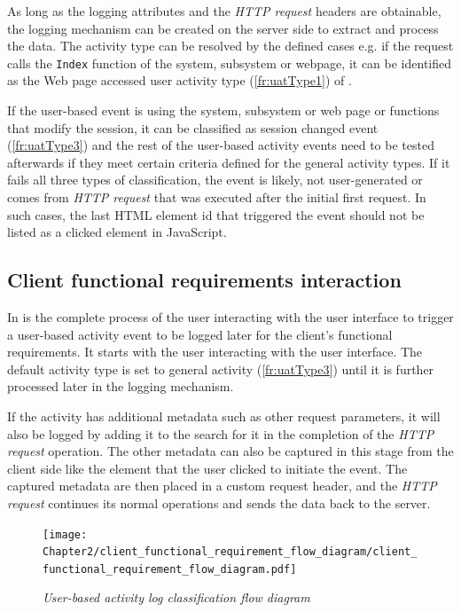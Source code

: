 As long as the logging attributes and the \textit{HTTP request} headers are obtainable, the logging mechanism can be created on the server side to extract and process the data. The activity type can be resolved by the defined cases e.g. if the request calls the \texttt{Index} function of the system, subsystem or webpage, it can be identified as the Web page accessed user activity type (\ref{fr:uatType1}) of .\par If the user-based event is using the system, subsystem or web page or functions that modify the session, it can be classified as session changed event (\ref{fr:uatType3}) and the rest of the user-based activity events need to be tested afterwards if they meet certain criteria defined for the general activity types. If it fails all three types of classification, the event is likely, not user-generated or comes from \textit{HTTP request} that was executed after the initial first request. In such cases, the last HTML element id that triggered the event should not be listed as a clicked element in JavaScript.

\subsection{Client functional requirements interaction}
\par In  is the complete process of the user interacting with the user interface to trigger a user-based activity event to be logged later for the client's functional requirements. It starts with the user interacting with the user interface. The default activity type is set to general activity (\ref{fr:uatType3}) until it is further processed later in the logging mechanism.\par If the activity has additional metadata such as other request parameters, it will also be logged by adding it to the search for it in the completion of the \textit{HTTP request} operation. The other metadata can also be captured in this stage from the client side like the element that the user clicked to initiate the event. The captured metadata are then placed in a custom request header, and the \textit{HTTP request} continues its normal operations and sends the data back to the server.

\clearpage

\begin{figure}[!htb] %
	\centering %
	\texttt{[image: Chapter2/client\_functional\_requirement\_flow\_diagram/client\_functional\_requirement\_flow\_diagram.pdf]}
	\caption[User-based activity log classification flow diagram]
	{\textit{User-based activity log classification flow diagram}}\label{fig:ch2_user_based_actvity_classification}
\end{figure}

